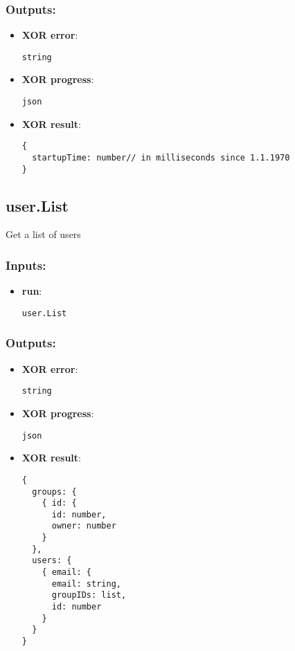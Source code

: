 \subsubsection*{Outputs:}
\begin{itemize}
    \item \textbf{XOR error}: 
\begin{lstlisting}
string
\end{lstlisting}
    \item \textbf{XOR progress}: 
\begin{lstlisting}
json
\end{lstlisting}
    \item \textbf{XOR result}: 
\begin{lstlisting}
{
  startupTime: number// in milliseconds since 1.1.1970
}
\end{lstlisting}
  \end{itemize}

\subsection{user.List}
\label{ch:builtinservices:user.List}
Get a list of users
\subsubsection*{Inputs:}
\begin{itemize}
    \item \textbf{run}: 
\begin{lstlisting}
user.List
\end{lstlisting}
  \end{itemize}

\subsubsection*{Outputs:}
\begin{itemize}
    \item \textbf{XOR error}: 
\begin{lstlisting}
string
\end{lstlisting}
    \item \textbf{XOR progress}: 
\begin{lstlisting}
json
\end{lstlisting}
    \item \textbf{XOR result}: 
\begin{lstlisting}
{
  groups: {
    { id: {
      id: number, 
      owner: number
    }
  }, 
  users: {
    { email: {
      email: string, 
      groupIDs: list, 
      id: number
    }
  }
}
\end{lstlisting}
  \end{itemize}

